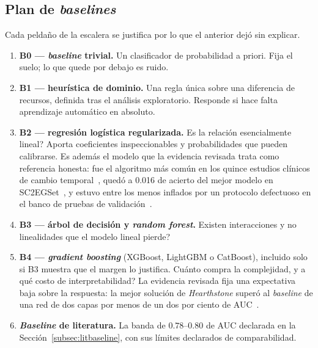 \documentclass[conference]{IEEEtran}
\begin{document}
\subsection{Plan de \emph{baselines}}
\label{subsec:baselines}
Cada pelda\~no de la escalera se justifica por lo que el anterior dej\'o sin
explicar.
\begin{enumerate}
  \item \textbf{B0 --- \emph{baseline} trivial.} Un clasificador de
        probabilidad a priori. Fija el suelo; lo que quede por debajo es
        ruido.
  \item \textbf{B1 --- heur\'istica de dominio.} Una regla \'unica sobre una
        diferencia de recursos, definida tras el an\'alisis exploratorio.
        Responde si hace falta aprendizaje autom\'atico en absoluto.
  \item \textbf{B2 --- regresi\'on log\'istica regularizada.}
        \textquestiondown Es la relaci\'on esencialmente lineal? Aporta coeficientes
        inspeccionables y probabilidades que pueden calibrarse. Es adem\'as
        el modelo que la evidencia revisada trata como referencia honesta:
        fue el algoritmo m\'as com\'un en los quince estudios cl\'inicos de
        cambio temporal~\cite{guo_temporalshift_2021}, qued\'o a 0.016 de
        acierto del mejor modelo en SC2EGSet~\cite{bialecki_sc2egset_2023},
        y estuvo entre los menos inflados por un protocolo defectuoso en el
        banco de pruebas de
        validaci\'on~\cite{karbalaie_participantaware_2026}.
  \item \textbf{B3 --- \'arbol de decisi\'on y \emph{random forest}.}
        \textquestiondown Existen interacciones y no linealidades que el modelo lineal
        pierde?
  \item \textbf{B4 --- \emph{gradient boosting}} (XGBoost, LightGBM o
        CatBoost), incluido solo si B3 muestra que el margen lo justifica.
        \textquestiondown Cu\'anto compra la complejidad, y a qu\'e costo de
        interpretabilidad? La evidencia revisada fija una expectativa baja
        sobre la respuesta: la mejor soluci\'on de \emph{Hearthstone}
        super\'o al \emph{baseline} de una red de dos capas por menos de un
        dos por ciento de AUC~\cite{janusz_hearthstone_2017}.
  \item \textbf{\emph{Baseline} de literatura.} La banda de $0.78$--$0.80$
        de AUC declarada en la Secci\'on~\ref{subsec:litbaseline}, con sus
        l\'imites declarados de comparabilidad.
\end{enumerate}
\end{document}
